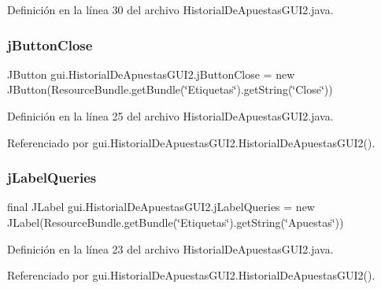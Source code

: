 Definición en la línea 30 del archivo Historial\+De\+Apuestas\+G\+U\+I2.\+java.

\mbox{\label{classgui_1_1HistorialDeApuestasGUI2_a7ca2382644c3a4c94bc4791b302a2f58}} 
\subsubsection{\texorpdfstring{jButtonClose}{jButtonClose}}
{\footnotesize\ttfamily J\+Button gui.\+Historial\+De\+Apuestas\+G\+U\+I2.\+j\+Button\+Close = new J\+Button(Resource\+Bundle.\+get\+Bundle(\char`\"{}Etiquetas\char`\"{}).get\+String(\char`\"{}Close\char`\"{}))\hspace{0.3cm}{\ttfamily [private]}}



Definición en la línea 25 del archivo Historial\+De\+Apuestas\+G\+U\+I2.\+java.



Referenciado por gui.\+Historial\+De\+Apuestas\+G\+U\+I2.\+Historial\+De\+Apuestas\+G\+U\+I2().

\mbox{\label{classgui_1_1HistorialDeApuestasGUI2_aae87a2fe0f346121594a611e38f3080b}} 
\subsubsection{\texorpdfstring{jLabelQueries}{jLabelQueries}}
{\footnotesize\ttfamily final J\+Label gui.\+Historial\+De\+Apuestas\+G\+U\+I2.\+j\+Label\+Queries = new J\+Label(Resource\+Bundle.\+get\+Bundle(\char`\"{}Etiquetas\char`\"{}).get\+String(\char`\"{}Apuestas\char`\"{}))\hspace{0.3cm}{\ttfamily [private]}}



Definición en la línea 23 del archivo Historial\+De\+Apuestas\+G\+U\+I2.\+java.



Referenciado por gui.\+Historial\+De\+Apuestas\+G\+U\+I2.\+Historial\+De\+Apuestas\+G\+U\+I2().

